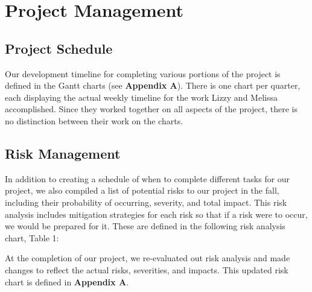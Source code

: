 \chapter{Project Management}

\section{Project Schedule}
Our development timeline for completing various portions of the project is defined in the Gantt charts (see \textbf{Appendix A}). There is one chart per quarter, each displaying the actual weekly timeline for the work Lizzy and Melissa accomplished. Since they worked together on all aspects of the project, there is no distinction between their work on the charts.

\section{Risk Management}
In addition to creating a schedule of when to complete different tasks for our project, we also compiled a list of potential risks to our project in the fall, including their probability of occurring, severity, and total impact. This risk analysis includes mitigation strategies for each risk so that if a risk were to occur, we would be prepared for it. These are defined in the following risk analysis chart, Table 1:

At the completion of our project, we re-evaluated out risk analysis and made changes to reflect the actual risks, severities, and impacts. This updated risk chart is defined in \textbf{Appendix A}.